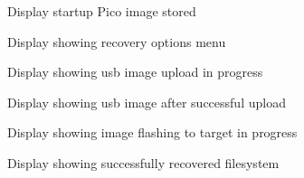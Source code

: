 \begin{figure}[ht]
	\centering
	\caption{Display startup Pico image stored}
	\label{fig:disp_startup_pico}
\end{figure}

\begin{figure}[ht]
	\centering
	\caption{Display showing recovery options menu}
	\label{fig:disp_menu}
\end{figure}

\begin{figure}[ht]
	\centering
	\caption{Display showing \gls{usb} image upload in progress}
	\label{fig:disp_usbload}
\end{figure}

\begin{figure}[ht]
	\centering
	\caption{Display showing \gls{usb} image after successful upload}
	\label{fig:disp_usbloaded}
\end{figure}

\begin{figure}[ht]
	\centering
	\caption{Display showing image flashing to target in progress}
	\label{fig:disp_flashwrite}
\end{figure}

\begin{figure}[ht]
	\centering
	\caption{Display showing successfully recovered filesystem}
	\label{fig:disp_fs_recovered}
\end{figure}


